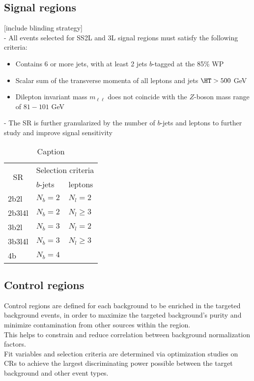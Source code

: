 \documentclass[../thesis.tex]{subfiles}
\begin{document}
\subsection{Signal regions}
[include blinding strategy]\\
- All events selected for SS2L and 3L signal regions must satisfy the following criteria:
\begin{itemize}
\item Contains 6 or more jets, with at least 2 jets $b$-tagged at the 85\% WP
\item Scalar sum of the transverse momenta of all leptons and jets $\HT > 500$ GeV
\item Dilepton invariant mass $m_{\ell\ell}$ does not coincide with the $Z$-boson mass range of $81-101$ GeV
\end{itemize}
- The SR is further granularized by the number of $b$-jets and leptons to further study and improve signal sensitivity\\

\begin{table}[!ht]
\centering
\caption{\label{tab:ana:SR}Caption}%
\begin{tabular}{p{2cm}|p{3cm}l}
\toprule\toprule
\multicolumn{1}{c|}{\multirow{ 2}{*}{SR}} & \multicolumn{2}{c}{Selection criteria} \\
\multicolumn{1}{c|}{}					  & $b$-jets	& leptons \\
\midrule
2b2l			& $N_b = 2$	& $N_l = 2$\\
2b3l4l			& $N_b = 2$	& $N_l \geq 3$\\
3b2l			& $N_b = 3$	& $N_l = 2$\\
3b3l4l			& $N_b = 3$	& $N_l \geq 3$\\
4b				& $N_b = 4$	& \\
\bottomrule\bottomrule
\end{tabular}
\end{table}

\subsection{Control regions}
Control regions are defined for each background to be enriched in the targeted background events, in order to maximize the targeted background's purity and minimize contamination from other sources within the region.\\
This helps to constrain and reduce correlation between background normalization factors.\\
Fit variables and selection criteria are determined via optimization studies on CRs to achieve the largest discriminating power possible between the target background and other event types.
\end{document}
